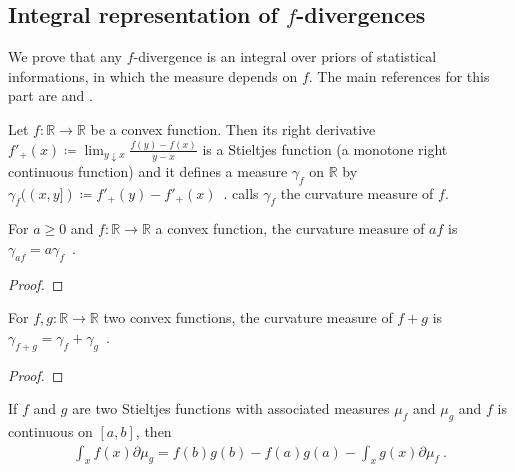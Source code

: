 \subsection{Integral representation of $f$-divergences}

We prove that any $f$-divergence is an integral over priors of statistical informations, in which the measure depends on $f$.
The main references for this part are \cite{liese2006divergences} and \cite{liese2012phi}.


\begin{definition}
  \label{def:curvatureMeasure}
  \leanok
  \uses{}
  Let $f: \mathbb{R} \to \mathbb{R}$ be a convex function. Then its right derivative $f'_+(x) \coloneqq \lim_{y \downarrow x}\frac{f(y) - f(x)}{y - x}$ is a Stieltjes function (a monotone right continuous function) and it defines a measure $\gamma_f$ on $\mathbb{R}$ by $\gamma_f((x,y]) \coloneqq f'_+(y) - f'_+(x)$~. \cite{liese2012phi} calls $\gamma_f$ the curvature measure of $f$.
\end{definition}


\begin{lemma}
  \label{lem:curvatureMeasure_mul}
  For $a \ge 0$ and $f: \mathbb{R} \to \mathbb{R}$ a convex function, the curvature measure of $af$ is $\gamma_{af} = a \gamma_f$~.
\end{lemma}

\begin{proof}%
\uses{}

\end{proof}


\begin{lemma}
  \label{lem:curvatureMeasure_add}
  For $f,g: \mathbb{R} \to \mathbb{R}$ two convex functions, the curvature measure of $f+g$ is $\gamma_{f+g} = \gamma_f + \gamma_g$~.
\end{lemma}

\begin{proof}%
\uses{}

\end{proof}


\begin{theorem}
  \label{thm:integration_by_parts}
  \notready
  \uses{}
  If $f$ and $g$ are two Stieltjes functions with associated measures $\mu_f$ and $\mu_g$ and $f$ is continuous on $[a, b]$, then
  \begin{align*}
  \int_x f(x) \partial\mu_g = f(b)g(b) - f(a)g(a) - \int_x g(x) \partial\mu_f \: .
  \end{align*}
\end{theorem}

